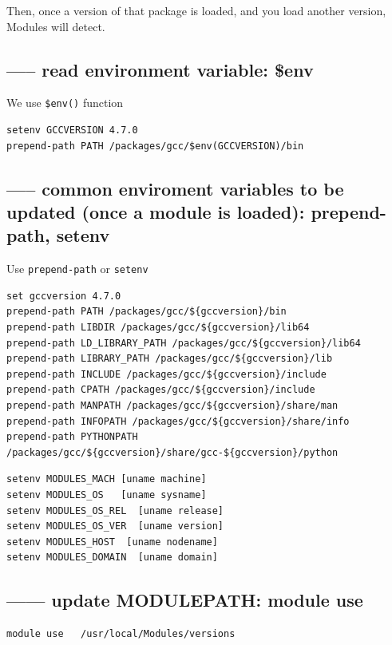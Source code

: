Then, once a version of that package is loaded, and you load another version,
Modules will detect.

\subsection{----- read environment variable: \$env}


We use \verb!$env()! function

\begin{verbatim}
setenv GCCVERSION 4.7.0
prepend-path PATH /packages/gcc/$env(GCCVERSION)/bin
\end{verbatim}



\subsection{----- common enviroment variables to be updated (once a module is
loaded): prepend-path, setenv}

Use \verb!prepend-path! or \verb!setenv! 

\begin{verbatim}
set gccversion 4.7.0
prepend-path PATH /packages/gcc/${gccversion}/bin
prepend-path LIBDIR /packages/gcc/${gccversion}/lib64
prepend-path LD_LIBRARY_PATH /packages/gcc/${gccversion}/lib64
prepend-path LIBRARY_PATH /packages/gcc/${gccversion}/lib
prepend-path INCLUDE /packages/gcc/${gccversion}/include
prepend-path CPATH /packages/gcc/${gccversion}/include
prepend-path MANPATH /packages/gcc/${gccversion}/share/man
prepend-path INFOPATH /packages/gcc/${gccversion}/share/info
prepend-path PYTHONPATH /packages/gcc/${gccversion}/share/gcc-${gccversion}/python
\end{verbatim}


\begin{verbatim}
setenv MODULES_MACH [uname machine]
setenv MODULES_OS   [uname sysname]
setenv MODULES_OS_REL  [uname release]
setenv MODULES_OS_VER  [uname version]
setenv MODULES_HOST  [uname nodename]
setenv MODULES_DOMAIN  [uname domain]
\end{verbatim}

\subsection{------ update MODULEPATH: module use}
\label{sec:MODULEPATH-update}

\begin{verbatim}
module use   /usr/local/Modules/versions
\end{verbatim}

